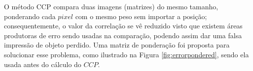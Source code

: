 O método CCP compara duas imagens (matrizes) do mesmo tamanho, 
ponderando cada $pixel$ com o mesmo peso sem importar a posição; 
consequentemente, o valor da correlação se vê reduzido visto que existem áreas produtoras 
de erro sendo usadas na comparação,
podendo assim dar uma falsa impressão de objeto perdido. 
Uma matriz de ponderação foi proposta para solucionar esse problema, como ilustrado na 
Figura \ref{fig:errorpondered}, sendo
ela usada antes do cálculo do $CCP$.

